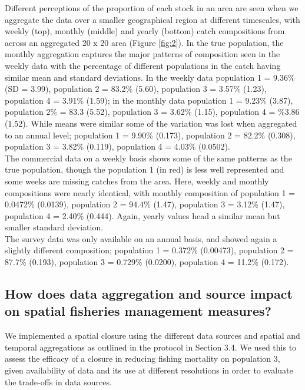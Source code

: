 \documentclass[review]{elsarticle}
\begin{document}
Different perceptions of the proportion of each stock in an area are seen when
we aggregate the data over a smaller geographical region at different
timescales, with weekly (top), monthly (middle) and yearly (bottom) catch
compositions from across an aggregated 20 x 20 area (Figure \ref{fig:2}). In
the true population, the monthly aggregation captures the major patterns of
composition seen in the weekly data with the percentage of different
populations in the catch having similar mean and standard deviations.  In the
weekly data population 1 = 9.36\% (SD = 3.99), population 2 = 83.2\% (5.60),
population 3 = 3.57\% (1.23), population 4 = 3.91\% (1.59); in the monthly data
population 1 = 9.23\% (3.87), population 2\% = 83.3 (5.52), population 3 =
3.62\% (1.15), population 4 = \%3.86 (1.52). While means were similar some of
the variation was lost when aggregated to an annual level; population 1 =
9.90\% (0.173), population 2 = 82.2\% (0.308), population 3 = 3.82\% (0.119),
population 4 = 4.03\% (0.0502).\\

The commercial data on a weekly basis shows some of the same patterns as the
true population, though the population 1 (in red) is less well represented and
some weeks are missing catches from the area. Here, weekly and monthly
compositions were nearly identical, with monthly composition of population 1 =
0.0472\% (0.0139), population 2 = 94.4\% (1.47), population 3 = 3.12\% (1.47),
population 4 = 2.40\% (0.444). Again, yearly values head a similar mean but
smaller standard deviation.\\

The survey data was only available on an annual basis, and showed again a
slightly different composition; population 1 = 0.372\% (0.00473), population 2
= 87.7\% (0.193), population 3 = 0.729\% (0.0200), population 4 = 11.2\%
(0.172).

\subsection{How does data aggregation and source impact on spatial fisheries
	management measures?}

We implemented a spatial closure using the different data sources and spatial
and temporal aggregations as outlined in the protocol in Section 3.4. We used
this to assess the efficacy of a closure in reducing fishing mortality on
population 3, given availability of data and its use at different resolutions in
order to evaluate the trade-offs in data sources. 
\end{document}
